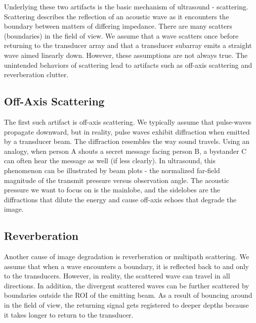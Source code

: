 Underlying these two artifacts is the basic mechanism of ultrasound - scattering. Scattering describes the reflection of an acoustic wave as it encounters the boundary between matters of differing impedance. There are many scatters (boundaries) in the field of view. We assume that a wave scatters once before returning to the transducer array and that a transducer subarray emits a straight wave aimed linearly down. However, these assumptions are not always true. The unintended behaviors of scattering lead to artifacts such as off-axis scattering and reverberation clutter. %


\subsection{Off-Axis Scattering}

The first such artifact is off-axis scattering. We typically assume that pulse-waves propagate downward, but in reality, pulse waves exhibit diffraction when emitted by a transducer beam. The diffraction resembles the way sound travels. Using an analogy, when person A shouts a secret message facing person B, a bystander C can often hear the message as well (if less clearly). In ultrasound, this phenomenon can be illustrated by beam plots - the normalized far-field magnitude of the transmit pressure versus observation angle. The acoustic pressure we want to focus on is the mainlobe, and the sidelobes are the diffractions that dilute the energy and cause off-axis echoes that degrade the image.


\subsection{Reverberation}

Another cause of image degradation is reverberation or multipath scattering. We assume that when a wave encounters a boundary, it is reflected back to and only to the transducers. However, in reality, the scattered wave can travel in all directions. In addition, the divergent scattered waves can be further scattered by boundaries outside the ROI of the emitting beam. As a result of bouncing around in the field of view, the returning signal gets registered to deeper depths because it takes longer to return to the transducer.

